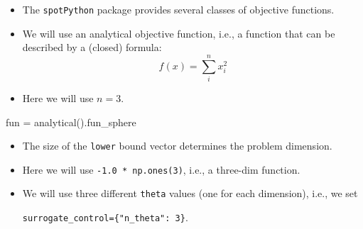 \documentclass[
  letterpaper,
  DIV=11,
  numbers=noendperiod]{scrreprt}
\newenvironment{Shaded}{\begin{snugshade}}{\end{snugshade}}
\newcommand{\NormalTok}[1]{\textcolor[rgb]{0.00,0.23,0.31}{#1}}
\newcommand{\OperatorTok}[1]{\textcolor[rgb]{0.37,0.37,0.37}{#1}}
\begin{document}
\begin{itemize}
\item
  The \texttt{spotPython} package provides several classes of objective
  functions.
\item
  We will use an analytical objective function, i.e., a function that
  can be described by a (closed) formula: \[f(x) = \sum_i^n x_i^2 \]
\item
  Here we will use \(n=3\).
\end{itemize}

\begin{Shaded}
\begin{Highlighting}[]
\NormalTok{fun }\OperatorTok{=}\NormalTok{ analytical().fun\_sphere}
\end{Highlighting}
\end{Shaded}

\begin{itemize}
\item
  The size of the \texttt{lower} bound vector determines the problem
  dimension.
\item
  Here we will use \texttt{-1.0\ *\ np.ones(3)}, i.e., a three-dim
  function.
\item
  We will use three different \texttt{theta} values (one for each
  dimension), i.e., we set

  \texttt{surrogate\_control=\{"n\_theta":\ 3\}}.
\end{itemize}
\end{document}
